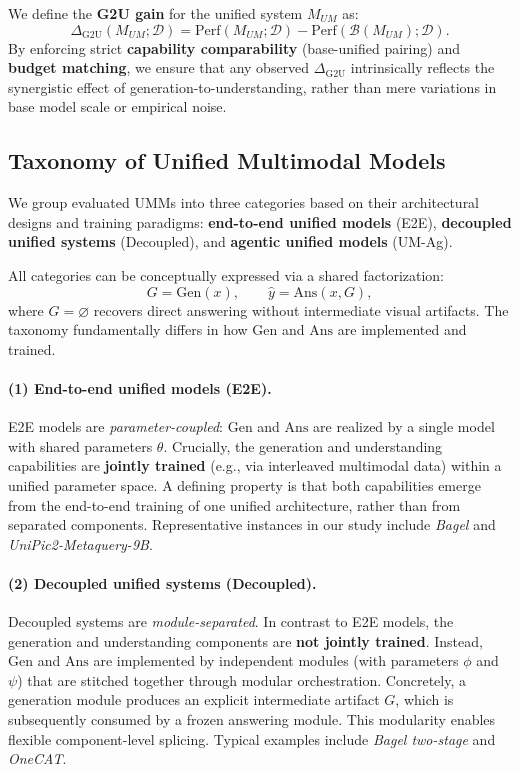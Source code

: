 \documentclass{article}
\theoremstyle{plain}
\theoremstyle{definition}
\theoremstyle{remark}
\begin{document}
We define the \textbf{G2U gain} for the unified system $M_{UM}$ as:
\begin{equation}
\Delta_{\mathrm{G2U}}(M_{UM};\mathcal{D})
= \mathrm{Perf}(M_{UM};\mathcal{D}) - \mathrm{Perf}(\mathcal{B}(M_{UM});\mathcal{D}).
\label{eq:g2u_gain}
\end{equation}
By enforcing strict \textbf{capability comparability} (base-unified pairing) and \textbf{budget matching}, we ensure that any observed $\Delta_{\mathrm{G2U}}$ intrinsically reflects the synergistic effect of generation-to-understanding, rather than mere variations in base model scale or empirical noise.

\subsection{Taxonomy of Unified Multimodal Models}
\label{sec:umm_taxonomy}

We group evaluated UMMs into three categories based on their architectural designs and training paradigms: \textbf{end-to-end unified models} (E2E), \textbf{decoupled unified systems} (Decoupled), and \textbf{agentic unified models} (UM-Ag).

All categories can be conceptually expressed via a shared factorization:
\begin{equation}
G=\mathrm{Gen}(x), \qquad \hat{y}=\mathrm{Ans}(x,G),
\label{eq:unified_factorization}
\end{equation}
where $G=\varnothing$ recovers direct answering without intermediate visual artifacts. The taxonomy fundamentally differs in how $\mathrm{Gen}$ and $\mathrm{Ans}$ are implemented and trained.

\paragraph{(1) End-to-end unified models (E2E).}
E2E models are \emph{parameter-coupled}: $\mathrm{Gen}$ and $\mathrm{Ans}$ are realized by a single model with shared parameters $\theta$. Crucially, the generation and understanding capabilities are \textbf{jointly trained} (e.g., via interleaved multimodal data) within a unified parameter space. A defining property is that both capabilities emerge from the end-to-end training of one unified architecture, rather than from separated components. Representative instances in our study include \emph{Bagel} and \emph{UniPic2-Metaquery-9B}.

\paragraph{(2) Decoupled unified systems (Decoupled).}
Decoupled systems are \emph{module-separated}. In contrast to E2E models, the generation and understanding components are \textbf{not jointly trained}. Instead, $\mathrm{Gen}$ and $\mathrm{Ans}$ are implemented by independent modules (with parameters $\phi$ and $\psi$) that are stitched together through modular orchestration. Concretely, a generation module produces an explicit intermediate artifact $G$, which is subsequently consumed by a frozen answering module. This modularity enables flexible component-level splicing. Typical examples include \emph{Bagel two-stage} and \emph{OneCAT}.
\end{document}
